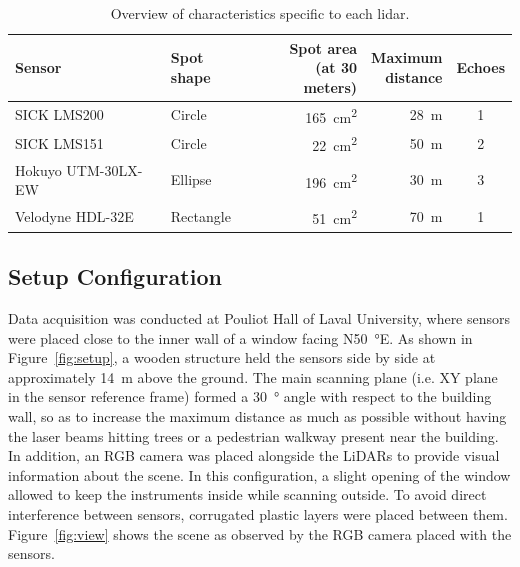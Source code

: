 \begin{table}[h]
    \centering
    \begin{tabular}{@{}llrrc@{}}
        \toprule
        \textbf{Sensor} & \textbf{Spot shape} & \makecell[cc]{\textbf{Spot area} \\ (at 30 meters)} & \makecell[cc]{\textbf{Maximum} \\ \textbf{distance}} & \textbf{Echoes} \\
        \hline
        SICK LMS200         & Circle    & \SI{165}{\centi\meter\squared} & \SI{28}{\meter} & 1 \\
        SICK LMS151         & Circle    & \SI{22}{\centi\meter\squared}  & \SI{50}{\meter} & 2 \\
        Hokuyo UTM-30LX-EW  & Ellipse   & \SI{196}{\centi\meter\squared} & \SI{30}{\meter} & 3 \\
        Velodyne HDL-32E    & Rectangle & \SI{51}{\centi\meter\squared}  & \SI{70}{\meter} & 1 \\
        \bottomrule
    \end{tabular}
    \caption[Overview of characteristics specific to each \gls*{lidar}.]{Overview of characteristics specific to each \gls*{lidar}.}
    \label{tab:lidars}
\end{table}

\subsection{Setup Configuration}

Data acquisition was conducted at Pouliot Hall of Laval University, where sensors were placed close to the inner wall of a window facing N\SI{50}{\degree}E. As shown in Figure~\ref{fig:setup}, a wooden structure held the sensors side by side at approximately \SI{14}{\meter} above the ground. The main scanning plane (i.e. XY plane in the sensor reference frame) formed a \SI{30}{\degree} angle with respect to the building wall, so as to increase the maximum distance as much as possible without having the laser beams hitting  trees or a pedestrian walkway present near the building. In addition, an RGB camera was placed alongside the LiDARs to provide visual information about the scene. In this configuration, a slight opening of the window allowed to keep the instruments inside while scanning outside. To avoid direct interference between sensors, corrugated plastic layers were placed between them. Figure~\ref{fig:view} shows the scene as observed by the RGB camera placed with the sensors.

